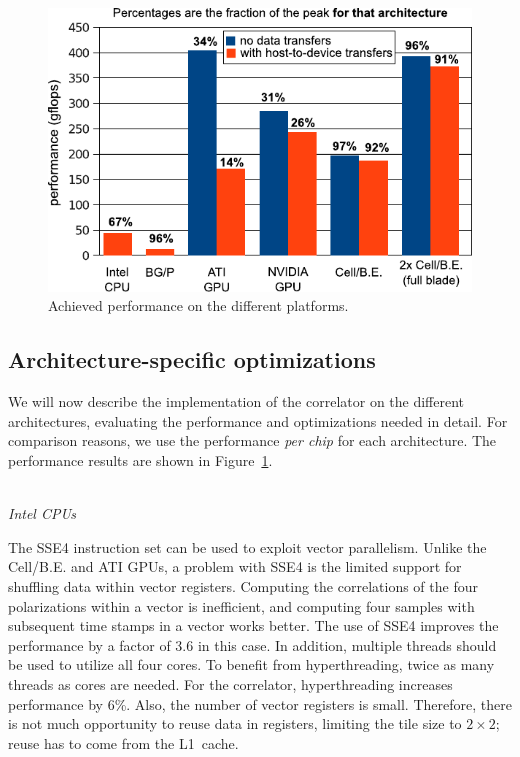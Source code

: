 \documentclass{article}
\begin{document}
\begin{figure}[t]
\begin{center}
\includegraphics[width=0.5\columnwidth]{figures/performance-graph-v2.pdf} %
\end{center}
\vspace{-0.5cm}
\caption{Achieved performance on the different platforms.}
\label{performance-graph}
\end{figure}



\subsection{Architecture-specific optimizations}
\label{sec:architecture-optimizations}

We will now describe the implementation of the correlator on
the different architectures, evaluating the performance and optimizations needed in detail. 
For comparison reasons, we use the performance
\emph{per chip} for each architecture.
The performance results are shown in Figure~\ref{performance-graph}.


\noindent \\ \emph{Intel CPUs}

\noindent The SSE4 instruction set can be used to exploit vector parallelism.  
Unlike the \mbox{Cell/B.E.} and ATI GPUs, a
problem with SSE4 is the limited support for shuffling data within
vector registers.  Computing the
correlations of the four polarizations within a vector is
inefficient, and computing four samples with subsequent time stamps in a vector works
better. 
The use of SSE4 improves the performance by a factor of 3.6
in this case.  In addition, multiple threads should be used to utilize all
four cores.  To benefit from hyperthreading, twice as many
threads as cores are needed.  For the correlator, hyperthreading increases performance by 6\%. 
Also, the number of vector registers is small.
Therefore, there is not much opportunity to reuse data in registers,
limiting the tile size to $2 \times 2$; reuse has to come from the
L1~cache.
\end{document}
